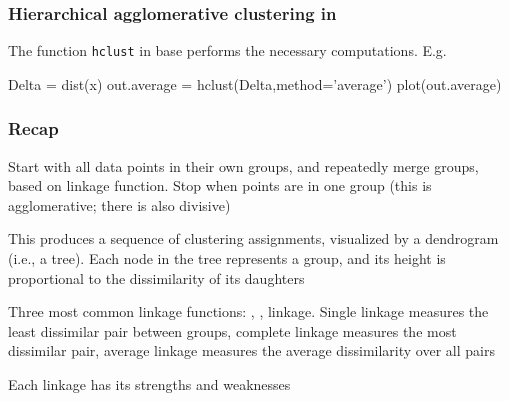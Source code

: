 \documentclass{beamer}
\begin{document}
\begin{frame}[fragile]
\frametitle{Hierarchical agglomerative clustering in }
The function {\tt hclust} in base  performs the necessary computations.  E.g.
\begin{blockcode}
Delta = dist(x)
out.average = hclust(Delta,method='average')
plot(out.average)
\end{blockcode}
\end{frame}

\begin{frame}
\frametitle{Recap}
 Start with all data points in
their own groups, and repeatedly merge groups, based on linkage
function. Stop when points are in one group (this is agglomerative;
there is also divisive)
\vsp

This produces a sequence of clustering assignments, visualized by a
dendrogram (i.e., a tree). Each node in the tree represents a group,
and its height is proportional to the dissimilarity of its daughters

\vsp
Three most common linkage functions: , , 
linkage. Single linkage measures the least dissimilar pair between
groups, complete linkage measures the most dissimilar pair,
average linkage measures the average dissimilarity over all pairs
\vsp

Each linkage has its strengths and weaknesses
\end{frame}
\end{document}

